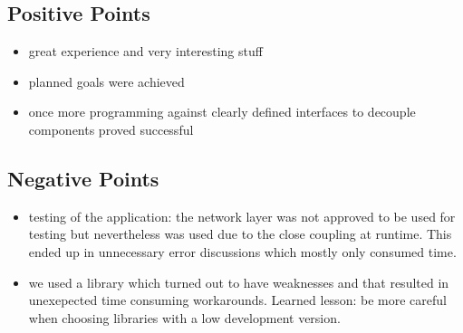 \subsection{Positive Points}
\begin{itemize}
\item great experience and very interesting stuff
\item planned goals were achieved
\item once more programming against clearly defined interfaces to decouple components proved successful
\end{itemize}

\subsection{Negative Points}
\begin{itemize}
\item testing of the application: the network layer was not approved to be used for testing but nevertheless was used due to the close coupling at runtime. This ended up in unnecessary error discussions which mostly only consumed time.
\item we used a library which turned out to have weaknesses and that resulted in unexepected time consuming workarounds. Learned lesson: be more careful when choosing libraries with a low development version.
\end{itemize}

